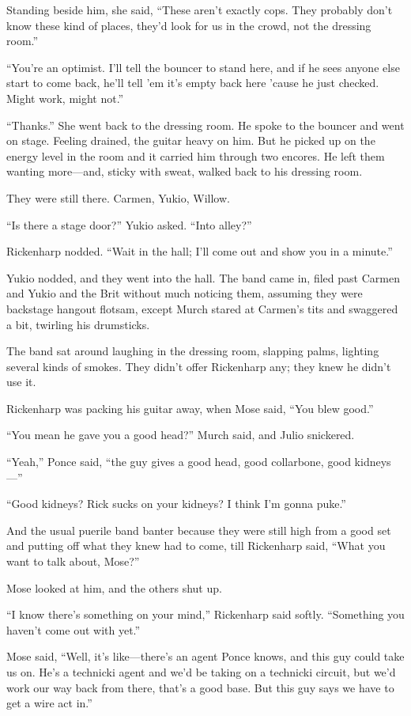 Standing beside him, she said, “These aren’t exactly cops. They probably don’t know these kind of places, they’d look for us in the crowd, not the dressing room.”

“You’re an optimist. I’ll tell the bouncer to stand here, and if he sees anyone else start to come back, he’ll tell ’em it’s empty back here ’cause he just checked. Might work, might not.”

“Thanks.” She went back to the dressing room. He spoke to the bouncer and went on stage. Feeling drained, the guitar heavy on him. But he picked up on the energy level in the room and it carried him through two encores. He left them wanting more—and, sticky with sweat, walked back to his dressing room.

They were still there. Carmen, Yukio, Willow.

“Is there a stage door?” Yukio asked. “Into alley?”

Rickenharp nodded. “Wait in the hall; I’ll come out and show you in a minute.”

Yukio nodded, and they went into the hall. The band came in, filed past Carmen and Yukio and the Brit without much noticing them, assuming they were backstage hangout flotsam, except Murch stared at Carmen’s tits and swaggered a bit, twirling his drumsticks.

The band sat around laughing in the dressing room, slapping palms, lighting several kinds of smokes. They didn’t offer Rickenharp any; they knew he didn’t use it.

Rickenharp was packing his guitar away, when Mose said, “You blew good.”

“You mean he gave you a good head?” Murch said, and Julio snickered.

“Yeah,” Ponce said, “the guy gives a good head, good collarbone, good kidneys—”

“Good kidneys? Rick sucks on your kidneys? I think I’m gonna puke.”

And the usual puerile band banter because they were still high from a good set and putting off what they knew had to come, till Rickenharp said, “What you want to talk about, Mose?”

Mose looked at him, and the others shut up.

“I know there’s something on your mind,” Rickenharp said softly. “Something you haven’t come out with yet.”

Mose said, “Well, it’s like—there’s an agent Ponce knows, and this guy could take us on. He’s a technicki agent and we’d be taking on a technicki circuit, but we’d work our way back from there, that’s a good base. But this guy says we have to get a wire act in.”

